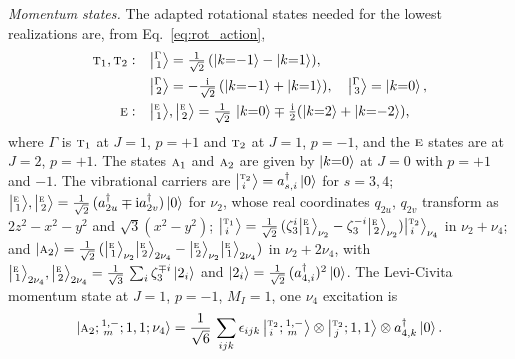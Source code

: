 \documentclass[
  reprint,
  aps,
  prx,
  superscriptaddress,
  amsmath,
  amssymb,
  longbibliography
]{revtex4-2}
\newcommand{\irr}[1]{\text{\normalfont\scshape #1}}
\newcommand{\iunit}{\mathrm{i}}
\newcommand{\rootunity}[1]{\zeta_{#1}}
\newcommand{\cgket}[3]{\bigl\lvert{}^{#1}_{\,#2};#3\bigr\rangle}
\newcommand{\irket}[2]{\bigl\lvert{}^{#1}_{\,#2}\bigr\rangle}
\newcommand{\parity}{p}               %
\begin{document}
\emph{Momentum states.} The adapted rotational states needed for the lowest realizations are, from Eq.~\eqref{eq:rot_action},
\begin{align}
\irr{t}_{1},\irr{t}_{2}:&\quad \irket{\Gamma}{1}=\tfrac{1}{\sqrt{2}}\,(\ket{k{=}{-1}}-\ket{k{=}1}),\nonumber\\
&\quad \irket{\Gamma}{2}=-\tfrac{\iunit}{\sqrt2}\,(\ket{k{=}{-1}}+\ket{k{=}1}),\quad \irket{\Gamma}{3}=\ket{k{=}0},\nonumber\\
\irr{e}:&\quad \irket{\irr{e}}{1},\irket{\irr{e}}{2}=\tfrac{1}{\sqrt{2}}\,\ket{k{=}0}\mp\tfrac{\iunit}{2}(\ket{k{=}2}+\ket{k{=}{-2}}),
\label{eq:td_rot}
\end{align}
where $\Gamma$ is $\irr{t}_{1}$ at $J=1$, $\parity=+1$ and $\irr{t}_{2}$ at $J=1$, $\parity=-1$, and the $\irr{e}$ states are at $J=2$, $\parity=+1$. The states $\irr{a}_{1}$ and $\irr{a}_{2}$ are given by $\ket{k{=}0}$ at $J=0$ with $\parity=+1$ and $-1$. The vibrational carriers are $\irket{\irr{t}_{2}}{i}=a^\dagger_{s,i}\ket0$ for $s=3,4$; $\irket{\irr{e}}{1},\irket{\irr{e}}{2}=\tfrac{1}{\sqrt{2}}\,(a^\dagger_{2u}\mp \iunit a^\dagger_{2v})\ket0$ for $\nu_2$, whose real coordinates $q_{2u}$, $q_{2v}$ transform as $2z^2-x^2-y^2$ and $\sqrt3(x^2-y^2)$; $\irket{\irr{t}_{1}}{i}=\tfrac{1}{\sqrt{2}}\,(\rootunity{3}^{i}\irket{\irr{e}}{1}_{\nu_2}-\rootunity{3}^{-i}\irket{\irr{e}}{2}_{\nu_2})\irket{\irr{t}_{2}}{i}_{\nu_4}$ in $\nu_2+\nu_4$; and $\ket{\irr{a}_{2}}=\tfrac{1}{\sqrt{2}}\,(\irket{\irr{e}}{1}_{\nu_2}\irket{\irr{e}}{2}_{2\nu_4}-\irket{\irr{e}}{2}_{\nu_2}\irket{\irr{e}}{1}_{2\nu_4})$ in $\nu_2+2\nu_4$, with $\irket{\irr{e}}{1}_{2\nu_4},\irket{\irr{e}}{2}_{2\nu_4}=\tfrac{1}{\sqrt{3}}\,\sum_i\rootunity{3}^{\mp i}\ket{2_i}$ and $\ket{2_i}=\tfrac{1}{\sqrt{2}}\,(a^\dagger_{4,i})^2\ket0$. The Levi-Civita momentum state at $J=1$, $\parity=-1$, $M_I=1$, one $\nu_4$ excitation is
\begin{equation}
\ket{\irr{a}_{2};{}^{1,-}_{\,m};1,1;\nu_4}=\frac{1}{\sqrt{6}}\,\sum_{ijk}\epsilon_{ijk}\,\cgket{\irr{t}_{2}}{i}{{}^{1,-}_{\,m}}\otimes\cgket{\irr{t}_{2}}{j}{1,1}\otimes a^\dagger_{4,k}\ket0 .
\label{eq:methane_levicivita}
\end{equation}
\end{document}

